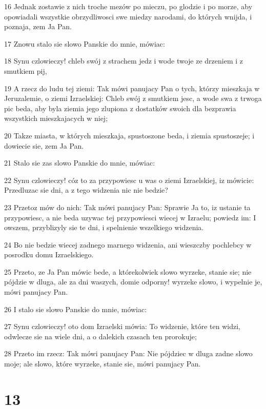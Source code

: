 \par 16 Jednak zostawie z nich troche mezów po mieczu, po glodzie i po morze, aby opowiadali wszystkie obrzydliwosci swe miedzy narodami, do których wnijda, i poznaja, zem Ja Pan.
\par 17 Znowu stalo sie slowo Panskie do mnie, mówiac:
\par 18 Synu czlowieczy! chleb swój z strachem jedz i wode twoje ze drzeniem i z smutkiem pij,
\par 19 A rzecz do ludu tej ziemi: Tak mówi panujacy Pan o tych, którzy mieszkaja w Jeruzalemie, o ziemi Izraelskiej: Chleb swój z smutkiem jesc, a wode swa z trwoga pic beda, aby byla ziemia jego zlupiona z dostatków swoich dla bezprawia wszystkich mieszkajacych w niej;
\par 20 Takze miasta, w których mieszkaja, spustoszone beda, i ziemia spustoszeje; i dowiecie sie, zem Ja Pan.
\par 21 Stalo sie zas slowo Panskie do mnie, mówiac:
\par 22 Synu czlowieczy! cóz to za przypowiesc u was o ziemi Izraelskiej, iz mówicie: Przedluzac sie dni, a z tego widzenia nic nie bedzie?
\par 23 Przetoz mów do nich: Tak mówi panujacy Pan: Sprawie Ja to, iz ustanie ta przypowiesc, a nie beda uzywac tej przypowiesci wiecej w Izraelu; powiedz im: I owszem, przyblizyly sie te dni, i spelnienie wszelkiego widzenia.
\par 24 Bo nie bedzie wiecej zadnego marnego widzenia, ani wieszczby pochlebcy w posrodku domu Izraelskiego.
\par 25 Przeto, ze Ja Pan mówic bede, a którekolwiek slowo wyrzeke, stanie sie; nie pójdzie w dluga, ale za dni waszych, domie odporny! wyrzeke slowo, i wypelnie je, mówi panujacy Pan.
\par 26 I stalo sie slowo Panskie do mnie, mówiac:
\par 27 Synu czlowieczy! oto dom Izraelski mówia: To widzenie, które ten widzi, odwlecze sie na wiele dni, a o dalekich czasach ten prorokuje;
\par 28 Przeto im rzecz: Tak mówi panujacy Pan: Nie pójdziec w dluga zadne slowo moje; ale slowo, które wyrzeke, stanie sie, mówi panujacy Pan.

\chapter{13}

